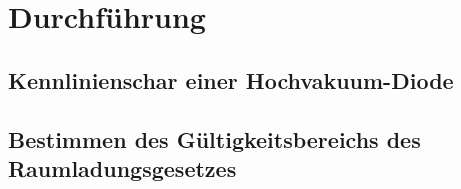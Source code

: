 \section{Durchführung}
\label{sec:Durchführung}
\subsection{Kennlinienschar einer Hochvakuum-Diode}

\subsection{Bestimmen des Gültigkeitsbereichs des Raumladungsgesetzes}
